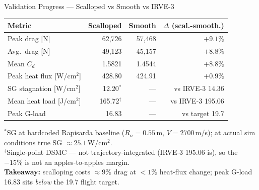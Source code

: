 \documentclass[aspectratio=169,10pt]{beamer}
\begin{document}
\begin{frame}{Validation Progress --- Scalloped vs Smooth vs IRVE-3}
  \centering
  \small
  \begin{tabular}{@{}lrrr@{}}
    \toprule
    Metric & Scalloped & Smooth & $\Delta$ (scal.-smooth.) \\
    \midrule
    Peak drag [N]        & 62{,}726 & 57{,}468 & $+9.1\%$ \\
    Avg.\ drag [N]       & 49{,}123 & 45{,}157 & $+8.8\%$ \\
    Mean $C_d$           & 1.5821   & 1.4544   & $+8.8\%$ \\
    Peak heat flux [W/cm$^2$] & 428.80 & 424.91 & $+0.9\%$ \\
    SG stagnation [W/cm$^2$]  & 12.20$^{*}$ & ---      & vs IRVE-3 14.36 \\
    Mean heat load [J/cm$^2$] & 165.72$^{\dagger}$ & ---      & vs IRVE-3 195.06 \\
    Peak G-load         & 16.83    & ---      & vs target 19.7 \\
    \bottomrule
  \end{tabular}
  \vspace{6pt}

  {\footnotesize $^{*}$SG at hardcoded Rapisarda baseline
  ($R_n{=}0.55$\,m, $V{=}2700$\,m/s); at actual sim conditions
  true SG $\approx 25.1$\,W/cm$^2$.\\
  $^{\dagger}$Single-point DSMC --- not trajectory-integrated
  (IRVE-3 195.06 is), so the $-15\%$ is not an
  apples-to-apples margin.}\\[2pt]
  \textbf{Takeaway:} scalloping costs $\approx 9\%$ drag at
  $<1\%$ heat-flux change; peak G-load 16.83 sits
  \emph{below} the 19.7 flight target.
\end{frame}
\end{document}
